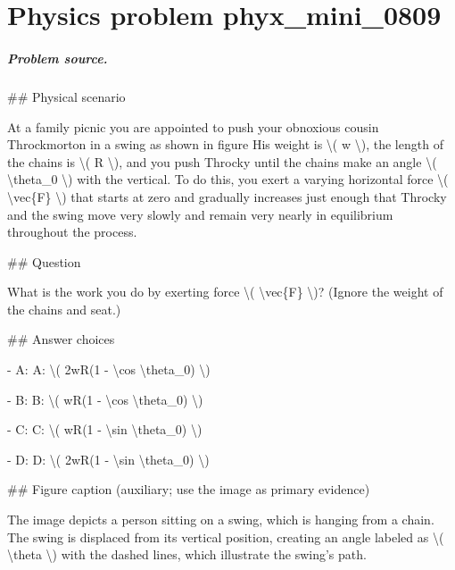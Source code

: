 
\chapter{Physics problem phyx\_mini\_0809}
\label{ch:PhyXMiniProblems_problem_phyx_mini_0809}

\paragraph{Problem source.}
\#\# Physical scenario

At a family picnic you are appointed to push your obnoxious cousin Throckmorton in a swing as shown in figure His weight is \textbackslash{}( w \textbackslash{}), the length of the chains is \textbackslash{}( R \textbackslash{}), and you push Throcky until the chains make an angle \textbackslash{}( \textbackslash{}theta\_0 \textbackslash{}) with the vertical. To do this, you exert a varying horizontal force \textbackslash{}( \textbackslash{}vec\{F\} \textbackslash{}) that starts at zero and gradually increases just enough that Throcky and the swing move very slowly and remain very nearly in equilibrium throughout the process.

\#\# Question

What is the work you do by exerting force \textbackslash{}( \textbackslash{}vec\{F\} \textbackslash{})? (Ignore the weight of the chains and seat.)

\#\# Answer choices

- A: A: \textbackslash{}( 2wR(1 - \textbackslash{}cos \textbackslash{}theta\_0) \textbackslash{})

- B: B: \textbackslash{}( wR(1 - \textbackslash{}cos \textbackslash{}theta\_0) \textbackslash{})

- C: C: \textbackslash{}( wR(1 - \textbackslash{}sin \textbackslash{}theta\_0) \textbackslash{})

- D: D: \textbackslash{}( 2wR(1 - \textbackslash{}sin \textbackslash{}theta\_0) \textbackslash{})

\#\# Figure caption (auxiliary; use the image as primary evidence)

The image depicts a person sitting on a swing, which is hanging from a chain. The swing is displaced from its vertical position, creating an angle labeled as \textbackslash{}( \textbackslash{}theta \textbackslash{}) with the dashed lines, which illustrate the swing’s path.

